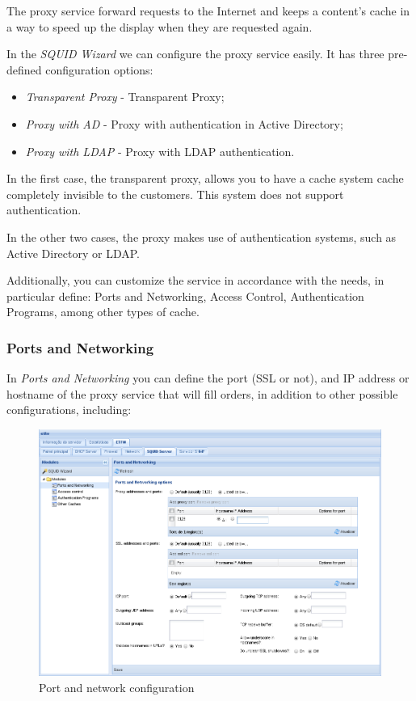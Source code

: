 The proxy service forward requests to the Internet and keeps a content's cache in a way to speed up the display when they are requested again.

In the \textit{SQUID Wizard} we can configure the proxy service easily. It has three pre-defined configuration options:

\begin{itemize}
    \item \textit{Transparent Proxy} - Transparent Proxy;
    \item \textit{Proxy with AD} - Proxy with authentication in Active Directory;
    \item \textit{Proxy with LDAP} - Proxy with LDAP authentication.
\end{itemize}

In the first case, the transparent proxy, allows you to have a cache system cache completely invisible to the customers. This system does not support authentication.

In the other two cases, the proxy makes use of authentication systems, such as Active Directory or LDAP.

Additionally, you can customize the service in accordance with the needs, in particular define: Ports and Networking, Access Control, Authentication Programs, among other types of cache.

\subsubsection{Ports and Networking}

In \textit{Ports and Networking} you can define the port (SSL or not), and IP address or hostname of the proxy service that will fill orders, in addition to other possible configurations, including:

\begin{figure}[H]
    \begin{center}
    \includegraphics[scale=0.38]{screenshots/etfw/etfw_squid_portsnetworking_01.png}
    \caption{Port and network configuration}
    \label{fig:etfw_squid_portsnetworking_01}
    \end{center}
\end{figure}

